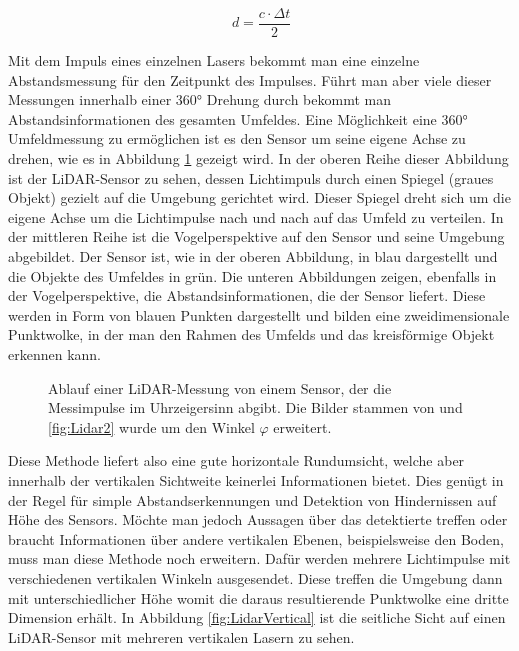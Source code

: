 \begin{equation}
\label{eq:LidarDistance}
\ d = \frac{c\cdot\Delta t}{2}
\end{equation} 

Mit dem Impuls eines einzelnen Lasers bekommt man eine einzelne Abstandsmessung für den Zeitpunkt des Impulses. Führt man aber viele dieser Messungen innerhalb einer 360° Drehung durch bekommt man Abstandsinformationen des gesamten Umfeldes. Eine Möglichkeit eine 360° Umfeldmessung zu ermöglichen ist es den Sensor um seine eigene Achse zu drehen, wie es in Abbildung \ref{fig:Lidar} gezeigt wird. In der oberen Reihe dieser Abbildung ist der LiDAR-Sensor zu sehen, dessen Lichtimpuls durch einen Spiegel (graues Objekt) gezielt auf die Umgebung gerichtet wird. Dieser Spiegel dreht sich um die eigene Achse um die Lichtimpulse nach und nach auf das Umfeld zu verteilen. In der mittleren Reihe ist die Vogelperspektive auf den Sensor und seine Umgebung abgebildet. Der Sensor ist, wie in der oberen Abbildung, in blau dargestellt und die Objekte des Umfeldes in grün. Die unteren Abbildungen zeigen, ebenfalls in der Vogelperspektive, die Abstandsinformationen, die der Sensor liefert. Diese werden in Form von blauen Punkten dargestellt und bilden eine zweidimensionale Punktwolke, in der man den Rahmen des Umfelds und das kreisförmige Objekt erkennen kann.\\

\begin{figure}%
    \centering
    \qquad
    \qquad
    \caption{Ablauf einer LiDAR-Messung von einem Sensor, der die Messimpulse im Uhrzeigersinn abgibt. Die Bilder stammen von \cite{bib:LidarPictures} und \ref {fig:Lidar2} wurde um den Winkel $\varphi$ erweitert.}\label{fig:Lidar}%
\end{figure}

Diese Methode liefert also eine gute horizontale Rundumsicht, welche aber innerhalb der vertikalen Sichtweite keinerlei Informationen bietet. Dies genügt in der Regel für simple Abstandserkennungen und Detektion von Hindernissen auf Höhe des Sensors. Möchte man jedoch Aussagen über das detektierte treffen oder braucht Informationen über andere vertikalen Ebenen, beispielsweise den Boden, muss man diese Methode noch erweitern. Dafür werden mehrere Lichtimpulse mit verschiedenen vertikalen Winkeln ausgesendet. Diese treffen die Umgebung dann mit unterschiedlicher Höhe womit die daraus resultierende Punktwolke eine dritte Dimension erhält. In Abbildung \ref{fig:LidarVertical} ist die seitliche Sicht auf einen LiDAR-Sensor mit mehreren vertikalen Lasern zu sehen.\\

